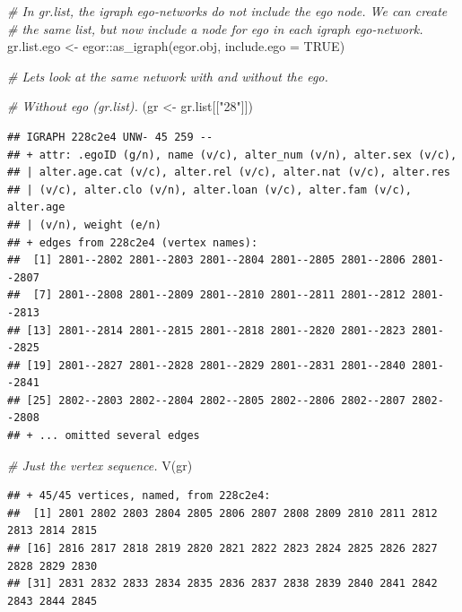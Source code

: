 \documentclass[
]{book}
\newenvironment{Shaded}{\begin{snugshade}}{\end{snugshade}}
\newcommand{\AttributeTok}[1]{\textcolor[rgb]{0.77,0.63,0.00}{#1}}
\newcommand{\CommentTok}[1]{\textcolor[rgb]{0.56,0.35,0.01}{\textit{#1}}}
\newcommand{\ConstantTok}[1]{\textcolor[rgb]{0.00,0.00,0.00}{#1}}
\newcommand{\FunctionTok}[1]{\textcolor[rgb]{0.00,0.00,0.00}{#1}}
\newcommand{\NormalTok}[1]{#1}
\newcommand{\OtherTok}[1]{\textcolor[rgb]{0.56,0.35,0.01}{#1}}
\newcommand{\SpecialCharTok}[1]{\textcolor[rgb]{0.00,0.00,0.00}{#1}}
\newcommand{\StringTok}[1]{\textcolor[rgb]{0.31,0.60,0.02}{#1}}
\begin{document}
\begin{Shaded}
\begin{Highlighting}[]
\CommentTok{\# In gr.list, the igraph ego{-}networks do not include the ego node. We can create}
\CommentTok{\# the same list, but now include a node for ego in each igraph ego{-}network.}
\NormalTok{gr.list.ego }\OtherTok{\textless{}{-}}\NormalTok{ egor}\SpecialCharTok{::}\FunctionTok{as\_igraph}\NormalTok{(egor.obj, }\AttributeTok{include.ego =} \ConstantTok{TRUE}\NormalTok{)}

\CommentTok{\# Let\textquotesingle{}s look at the same network with and without the ego.}

\CommentTok{\# Without ego (gr.list).}
\NormalTok{(gr }\OtherTok{\textless{}{-}}\NormalTok{ gr.list[[}\StringTok{"28"}\NormalTok{]])}
\end{Highlighting}
\end{Shaded}

\begin{verbatim}
## IGRAPH 228c2e4 UNW- 45 259 -- 
## + attr: .egoID (g/n), name (v/c), alter_num (v/n), alter.sex (v/c),
## | alter.age.cat (v/c), alter.rel (v/c), alter.nat (v/c), alter.res
## | (v/c), alter.clo (v/n), alter.loan (v/c), alter.fam (v/c), alter.age
## | (v/n), weight (e/n)
## + edges from 228c2e4 (vertex names):
##  [1] 2801--2802 2801--2803 2801--2804 2801--2805 2801--2806 2801--2807
##  [7] 2801--2808 2801--2809 2801--2810 2801--2811 2801--2812 2801--2813
## [13] 2801--2814 2801--2815 2801--2818 2801--2820 2801--2823 2801--2825
## [19] 2801--2827 2801--2828 2801--2829 2801--2831 2801--2840 2801--2841
## [25] 2802--2803 2802--2804 2802--2805 2802--2806 2802--2807 2802--2808
## + ... omitted several edges
\end{verbatim}

\begin{Shaded}
\begin{Highlighting}[]
\CommentTok{\# Just the vertex sequence.}
\FunctionTok{V}\NormalTok{(gr)}
\end{Highlighting}
\end{Shaded}

\begin{verbatim}
## + 45/45 vertices, named, from 228c2e4:
##  [1] 2801 2802 2803 2804 2805 2806 2807 2808 2809 2810 2811 2812 2813 2814 2815
## [16] 2816 2817 2818 2819 2820 2821 2822 2823 2824 2825 2826 2827 2828 2829 2830
## [31] 2831 2832 2833 2834 2835 2836 2837 2838 2839 2840 2841 2842 2843 2844 2845
\end{verbatim}
\end{document}

